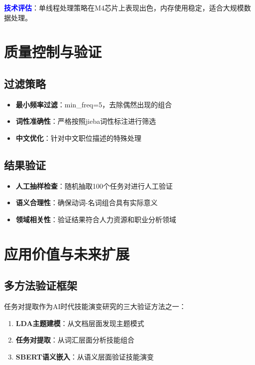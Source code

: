 \documentclass[11pt,a4paper]{article}
\begin{document}
\textcolor{blue}{\textbf{技术评估}}：单线程处理策略在M4芯片上表现出色，内存使用稳定，适合大规模数据处理。

\section{质量控制与验证}

\subsection{过滤策略}

\begin{itemize}
    \item \textbf{最小频率过滤}：min\_freq=5，去除偶然出现的组合
    \item \textbf{词性准确性}：严格按照jieba词性标注进行筛选
    \item \textbf{中文优化}：针对中文职位描述的特殊处理
\end{itemize}

\subsection{结果验证}

\begin{itemize}
    \item \textbf{人工抽样检查}：随机抽取100个任务对进行人工验证
    \item \textbf{语义合理性}：确保动词-名词组合具有实际意义
    \item \textbf{领域相关性}：验证结果符合人力资源和职业分析领域
\end{itemize}

\section{应用价值与未来扩展}

\subsection{多方法验证框架}

任务对提取作为AI时代技能演变研究的三大验证方法之一：

\begin{enumerate}
    \item \textbf{LDA主题建模}：从文档层面发现主题模式
    \item \textbf{任务对提取}：从词汇层面分析技能组合
    \item \textbf{SBERT语义嵌入}：从语义层面验证技能演变
\end{enumerate}
\end{document}

